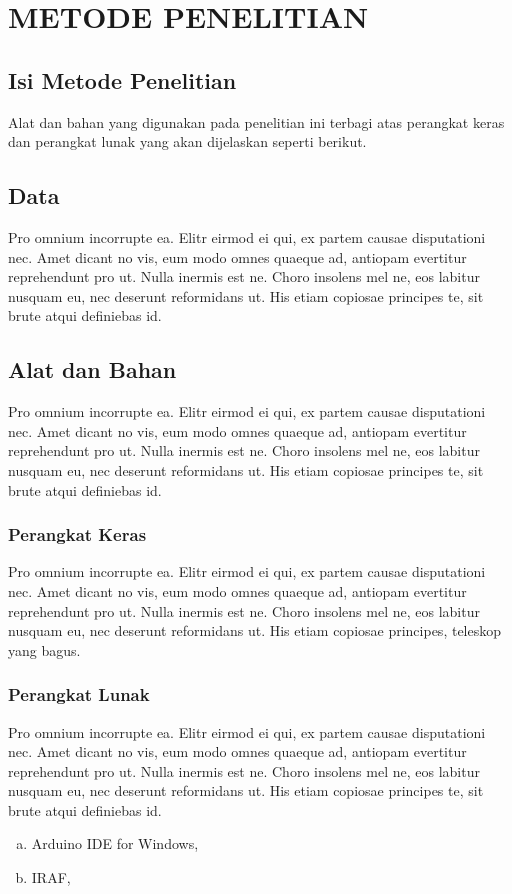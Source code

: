 \chapter{METODE PENELITIAN}

\section{Isi Metode Penelitian}
\noindent Alat dan bahan yang digunakan pada penelitian ini terbagi atas perangkat keras dan perangkat lunak yang akan dijelaskan seperti berikut.

\section{Data}
\noindent Pro omnium incorrupte ea. Elitr eirmod ei qui, ex partem causae disputationi nec. Amet dicant no vis, eum modo omnes quaeque ad, antiopam evertitur reprehendunt pro ut. Nulla inermis est ne. Choro insolens mel ne, eos labitur nusquam eu, nec deserunt reformidans ut. His etiam copiosae principes te, sit brute atqui definiebas id.

\section{Alat dan Bahan}
\noindent Pro omnium incorrupte ea. Elitr eirmod ei qui, ex partem causae disputationi nec. Amet dicant no vis, eum modo omnes quaeque ad, antiopam evertitur reprehendunt pro ut. Nulla inermis est ne. Choro insolens mel ne, eos labitur nusquam eu, nec deserunt reformidans ut. His etiam copiosae principes te, sit brute atqui definiebas id.

    \subsection{Perangkat Keras}
    Pro omnium incorrupte ea. Elitr eirmod ei qui, ex partem causae disputationi nec. Amet dicant no vis, eum modo omnes quaeque ad, antiopam evertitur reprehendunt pro ut. Nulla inermis est ne. Choro insolens mel ne, eos labitur nusquam eu, nec deserunt reformidans ut. His etiam copiosae principes, teleskop yang bagus.

	\subsection{Perangkat Lunak}
    Pro omnium incorrupte ea. Elitr eirmod ei qui, ex partem causae disputationi nec. Amet dicant no vis, eum modo omnes quaeque ad, antiopam evertitur reprehendunt pro ut. Nulla inermis est ne. Choro insolens mel ne, eos labitur nusquam eu, nec deserunt reformidans ut. His etiam copiosae principes te, sit brute atqui definiebas id.
		\begin{enumerate}[a.]
		\itemsep0em
			\item Arduino IDE for Windows,
			\item IRAF,
		\end{enumerate}

